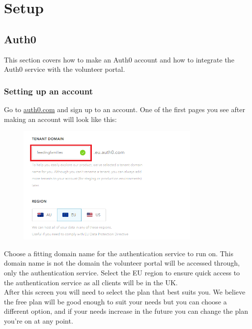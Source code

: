 \documentclass[12pt]{article}
\begin{document}
\newpage
\section{Setup} %



\subsection{Auth0}
This section covers how to make an Auth0 account and how to integrate the Auth0 service with the volunteer portal.

\subsubsection{Setting up an account}
Go to \href{https://auth0.com/signup}{auth0.com} and sign up to an account. One of the first pages you see after making an account will look like this:
\begin{figure}[H]
    \centering
    \includegraphics[width=0.8\textwidth]{auth0/tenantdomain.png}
\end{figure}
\noindent
Choose a fitting domain name for the authentication service to run on. This domain name is not the domain the volunteer portal will be accessed through, only the authentication service. Select the EU region to ensure quick access to the authentication service as all clients will be in the UK.\\

\noindent
After this screen you will need to select the plan that best suits you. We believe the free plan will be good enough to suit your needs but you can choose a different option, and if your needs increase in the future you can change the plan you're on at any point.\\
\end{document}

